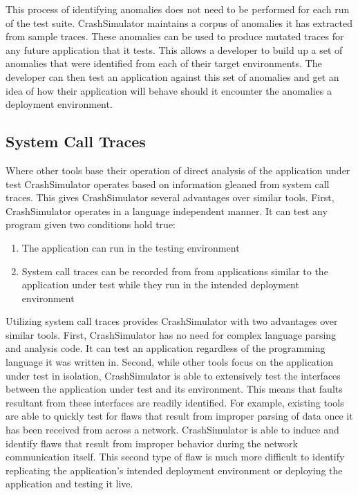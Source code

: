         This process of identifying anomalies does not need to be performed for each run of the test suite.
        CrashSimulator maintains a corpus of anomalies it has extracted from sample traces. These anomalies can be used
        to produce mutated traces for any future application that it tests. This allows a developer to build up a set of
        anomalies that were identified from each of their target environments. The developer can then test an
        application against this set of anomalies and get an idea of how their application will behave should it
        encounter the anomalies a deployment environment.

    \subsection{System Call Traces}

        Where other tools base their operation of direct analysis of the application under test CrashSimulator operates
        based on information gleaned from system call traces. This gives CrashSimulator several advantages over similar
        tools. First, CrashSimulator operates in a language independent manner. It can test any program given two
        conditions hold true:

        \begin{enumerate}
            \item{The application can run in the testing environment}
            \item{System call traces can be recorded from from applications similar to the application under test while
                they run in the intended deployment environment}
        \end{enumerate}

        Utilizing system call traces provides CrashSimulator with two advantages over similar tools. First,
        CrashSimulator has no need for complex language parsing and analysis code. It can test an application regardless
        of the programming language it was written in. Second, while other tools focus on the application under test in
        isolation, CrashSimulator is able to extensively test the interfaces between the application under test and its
        environment. This means that faults resultant from these interfaces are readily identified. For example,
        existing tools are able to quickly test for flaws that result from improper parsing of data once it
        has been received from across a network. CrashSimulator is able to induce and identify flaws that result from
        improper behavior during the network communication itself. This second type of flaw is much more difficult to
        identify replicating the application's intended deployment environment or deploying the application and testing
        it live.

